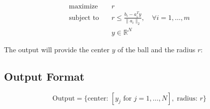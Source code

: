 \documentclass{article}
\begin{document}
\[
\begin{align*}
\text{maximize} & \quad r \\
\text{subject to} & \quad r \leq \frac{b_i - a_i^T y}{\| a_i \|_2}, \quad \forall i = 1, \ldots, m \\
                   & \quad y \in \mathbb{R}^N
\end{align*}
\]

The output will provide the center \( y \) of the ball and the radius \( r \):

\subsection*{Output Format}
\[
\text{Output} = \{ \text{center: } [y_j \text{ for } j = 1, \ldots, N], \; \text{radius: } r \}
\]
\end{document}
